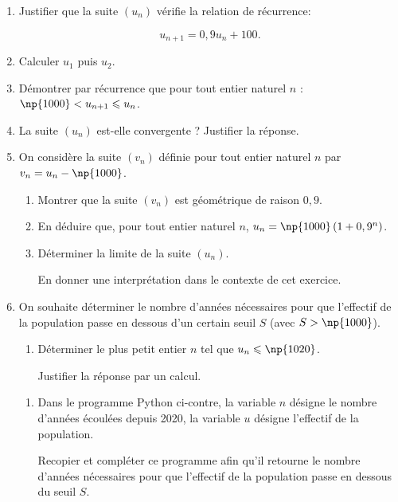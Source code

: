 \documentclass[11pt]{article}
\begin{document}
\begin{enumerate}
\item Justifier que la suite $\left(u_n\right)$ vérifie la relation de récurrence:

\[u_{n+1} = 0,9u_n + 100.\]

\item Calculer $u_1$ puis $u_2$.
\item Démontrer par récurrence que pour tout entier naturel $n$ :\: $\np{1000} < u_{n+1}  \leqslant u_n$.
\item La suite $\left(u_n\right)$ est-elle convergente ? Justifier la réponse.
\item On considère la suite $\left(v_n\right)$ définie pour tout entier naturel $n$ par $v_n = u_n - \np{1000}$.
	\begin{enumerate}
		\item Montrer que la suite $\left(v_n\right)$ est géométrique de raison $0,9$.
		\item En déduire que, pour tout entier naturel $n$,\: $u_n = \np{1000} \left(1 + 0,9^n\right)$.
		\item Déterminer la limite de la suite $\left(u_n\right)$.
		
En donner une interprétation dans le contexte de cet exercice.
	\end{enumerate}

\item On souhaite déterminer le nombre d'années nécessaires pour que l'effectif de la population passe en dessous d'un certain seuil $S$ (avec $S > \np{1000}$).
	\begin{enumerate}
		\item Déterminer le plus petit entier $n$ tel que $u_n \leqslant \np{1020}$.

Justifier la réponse par un calcul.
	\end{enumerate}
\begin{minipage}{0.58\linewidth}
	\begin{enumerate}[resume]
		\item Dans le programme Python ci-contre, la variable $n$ désigne le nombre d'années écoulées depuis 2020, la variable $u$ désigne l'effectif de la population. 
		
Recopier et compléter ce programme afin qu'il retourne le nombre d'années nécessaires pour que l'effectif de la population passe en dessous du seuil $S$.
	\end{enumerate}


\end{minipage}
\end{enumerate}
\end{document}
